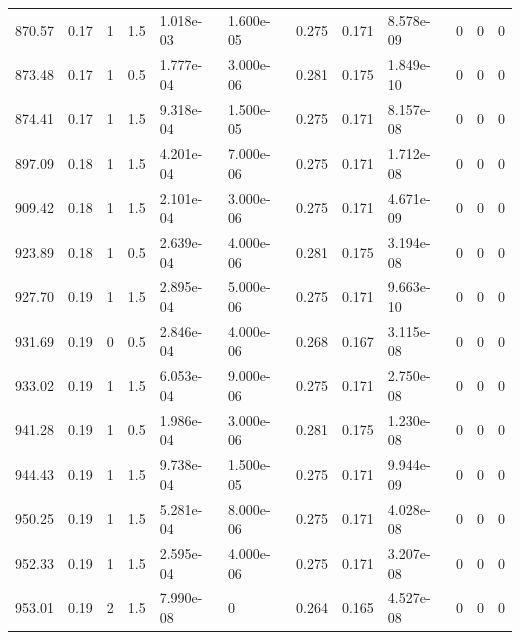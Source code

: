 \documentclass[preview]{standalone}
\begin{document}
{{{\begin{tabular}{L{1.2cm}C{1.2cm} C{0.3cm}C{0.5cm} C{1.4cm}C{1.4cm} C{1.4cm}C{1.4cm} C{1.6cm}C{1.6cm} C{1.6cm}C{1.6cm}}
  870.57  &  0.17  & 1     & 1.5 &  1.018e-03  & 1.600e-05  &  0.275&   0.171& 8.578e-09 & 0   &  0 & 0  \\ 
  873.48  &  0.17  & 1     & 0.5 &  1.777e-04  & 3.000e-06  &  0.281&   0.175& 1.849e-10 & 0   &  0 & 0  \\ 
  874.41  &  0.17  & 1     & 1.5 &  9.318e-04  & 1.500e-05  &  0.275&   0.171& 8.157e-08 & 0   &  0 & 0  \\ 
  897.09  &  0.18  & 1     & 1.5 &  4.201e-04  & 7.000e-06  &  0.275&   0.171& 1.712e-08 & 0   &  0 & 0  \\ 
  909.42  &  0.18  & 1     & 1.5 &  2.101e-04  & 3.000e-06  &  0.275&   0.171& 4.671e-09 & 0   &  0 & 0  \\ 
  923.89  &  0.18  & 1     & 0.5 &  2.639e-04  & 4.000e-06  &  0.281&   0.175& 3.194e-08 & 0   &  0 & 0  \\ 
  927.70  &  0.19  & 1     & 1.5 &  2.895e-04  & 5.000e-06  &  0.275&   0.171& 9.663e-10 & 0   &  0 & 0  \\ 
  931.69  &  0.19  & 0     & 0.5 &  2.846e-04  & 4.000e-06  &  0.268&   0.167& 3.115e-08 & 0   &  0 & 0  \\ 
  933.02  &  0.19  & 1     & 1.5 &  6.053e-04  & 9.000e-06  &  0.275&   0.171& 2.750e-08 & 0   &  0 & 0  \\ 
  941.28  &  0.19  & 1     & 0.5 &  1.986e-04  & 3.000e-06  &  0.281&   0.175& 1.230e-08 & 0   &  0 & 0  \\ 
  944.43  &  0.19  & 1     & 1.5 &  9.738e-04  & 1.500e-05  &  0.275&   0.171& 9.944e-09 & 0   &  0 & 0  \\ 
  950.25  &  0.19  & 1     & 1.5 &  5.281e-04  & 8.000e-06  &  0.275&   0.171& 4.028e-08 & 0   &  0 & 0  \\ 
  952.33  &  0.19  & 1     & 1.5 &  2.595e-04  & 4.000e-06  &  0.275&   0.171& 3.207e-08 & 0   &  0 & 0  \\ 
  953.01  &  0.19  & 2     & 1.5 &  7.990e-08  & 0  &  0.264&   0.165& 4.527e-08 & 0   &  0 & 0  \\ 
\hline 
\end{tabular} 

}}}
\end{document}
